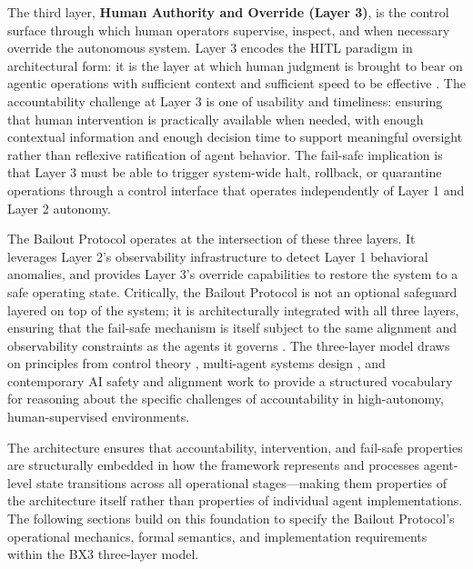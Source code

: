The third layer, \textbf{Human Authority and Override (Layer 3)}, is the control surface through which human operators supervise, inspect, and when necessary override the autonomous system. Layer 3 encodes the HITL paradigm in architectural form: it is the layer at which human judgment is brought to bear on agentic operations with sufficient context and sufficient speed to be effective \cite{tristr81}. The accountability challenge at Layer 3 is one of usability and timeliness: ensuring that human intervention is practically available when needed, with enough contextual information and enough decision time to support meaningful oversight rather than reflexive ratification of agent behavior. The fail-safe implication is that Layer 3 must be able to trigger system-wide halt, rollback, or quarantine operations through a control interface that operates independently of Layer 1 and Layer 2 autonomy.

The Bailout Protocol operates at the intersection of these three layers. It leverages Layer 2's observability infrastructure to detect Layer 1 behavioral anomalies, and provides Layer 3's override capabilities to restore the system to a safe operating state. Critically, the Bailout Protocol is not an optional safeguard layered on top of the system; it is architecturally integrated with all three layers, ensuring that the fail-safe mechanism is itself subject to the same alignment and observability constraints as the agents it governs \cite{wiener1948}. The three-layer model draws on principles from control theory \cite{wiener1948}, multi-agent systems design \cite{dijkstra1982}, and contemporary AI safety and alignment work \cite{bansal2019} to provide a structured vocabulary for reasoning about the specific challenges of accountability in high-autonomy, human-supervised environments.

The architecture ensures that accountability, intervention, and fail-safe properties are structurally embedded in how the framework represents and processes agent-level state transitions across all operational stages—making them properties of the architecture itself rather than properties of individual agent implementations. The following sections build on this foundation to specify the Bailout Protocol's operational mechanics, formal semantics, and implementation requirements within the BX3 three-layer model.